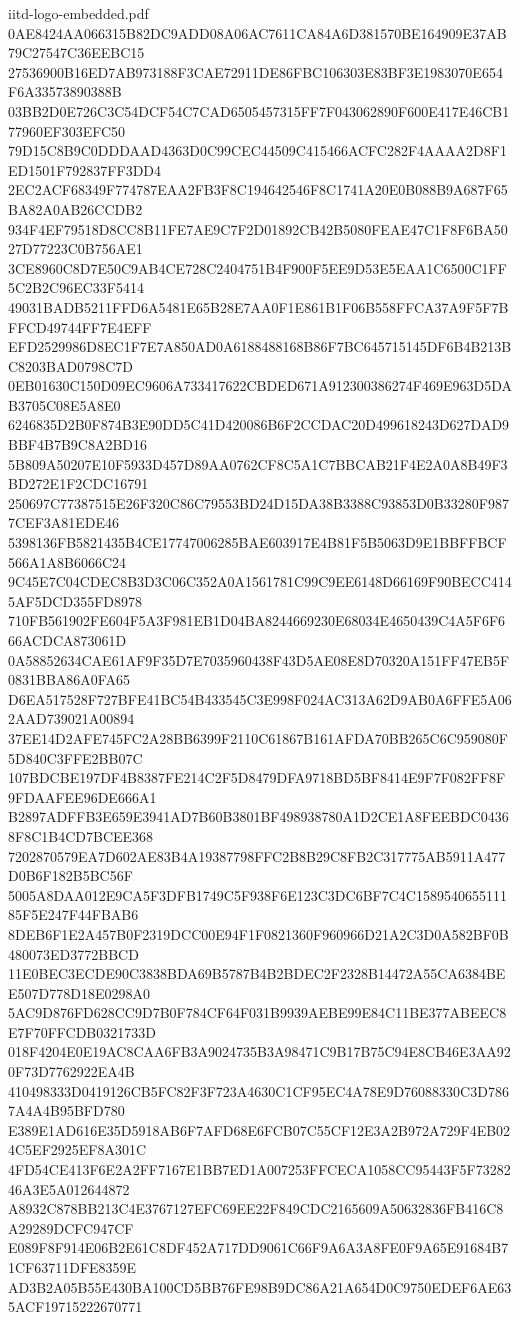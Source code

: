 \begin{filecontents*}[overwrite]{iitd-logo-embedded.pdf}
0AE8424AA066315B82DC9ADD08A06AC7611CA84A6D381570BE164909E37AB79C27547C36EEBC15
27536900B16ED7AB973188F3CAE72911DE86FBC106303E83BF3E1983070E654F6A33573890388B
03BB2D0E726C3C54DCF54C7CAD6505457315FF7F043062890F600E417E46CB177960EF303EFC50
79D15C8B9C0DDDAAD4363D0C99CEC44509C415466ACFC282F4AAAA2D8F1ED1501F792837FF3DD4
2EC2ACF68349F774787EAA2FB3F8C194642546F8C1741A20E0B088B9A687F65BA82A0AB26CCDB2
934F4EF79518D8CC8B11FE7AE9C7F2D01892CB42B5080FEAE47C1F8F6BA5027D77223C0B756AE1
3CE8960C8D7E50C9AB4CE728C2404751B4F900F5EE9D53E5EAA1C6500C1FF5C2B2C96EC33F5414
49031BADB5211FFD6A5481E65B28E7AA0F1E861B1F06B558FFCA37A9F5F7BFFCD49744FF7E4EFF
EFD2529986D8EC1F7E7A850AD0A6188488168B86F7BC645715145DF6B4B213BC8203BAD0798C7D
0EB01630C150D09EC9606A733417622CBDED671A912300386274F469E963D5DAB3705C08E5A8E0
6246835D2B0F874B3E90DD5C41D420086B6F2CCDAC20D499618243D627DAD9BBF4B7B9C8A2BD16
5B809A50207E10F5933D457D89AA0762CF8C5A1C7BBCAB21F4E2A0A8B49F3BD272E1F2CDC16791
250697C77387515E26F320C86C79553BD24D15DA38B3388C93853D0B33280F9877CEF3A81EDE46
5398136FB5821435B4CE17747006285BAE603917E4B81F5B5063D9E1BBFFBCF566A1A8B6066C24
9C45E7C04CDEC8B3D3C06C352A0A1561781C99C9EE6148D66169F90BECC4145AF5DCD355FD8978
710FB561902FE604F5A3F981EB1D04BA8244669230E68034E4650439C4A5F6F666ACDCA873061D
0A58852634CAE61AF9F35D7E7035960438F43D5AE08E8D70320A151FF47EB5F0831BBA86A0FA65
D6EA517528F727BFE41BC54B433545C3E998F024AC313A62D9AB0A6FFE5A062AAD739021A00894
37EE14D2AFE745FC2A28BB6399F2110C61867B161AFDA70BB265C6C959080F5D840C3FFE2BB07C
107BDCBE197DF4B8387FE214C2F5D8479DFA9718BD5BF8414E9F7F082FF8F9FDAAFEE96DE666A1
B2897ADFFB3E659E3941AD7B60B3801BF498938780A1D2CE1A8FEEBDC04368F8C1B4CD7BCEE368
7202870579EA7D602AE83B4A19387798FFC2B8B29C8FB2C317775AB5911A477D0B6F182B5BC56F
5005A8DAA012E9CA5F3DFB1749C5F938F6E123C3DC6BF7C4C158954065511185F5E247F44FBAB6
8DEB6F1E2A457B0F2319DCC00E94F1F0821360F960966D21A2C3D0A582BF0B480073ED3772BBCD
11E0BEC3ECDE90C3838BDA69B5787B4B2BDEC2F2328B14472A55CA6384BEE507D778D18E0298A0
5AC9D876FD628CC9D7B0F784CF64F031B9939AEBE99E84C11BE377ABEEC8E7F70FFCDB0321733D
018F4204E0E19AC8CAA6FB3A9024735B3A98471C9B17B75C94E8CB46E3AA920F73D7762922EA4B
410498333D0419126CB5FC82F3F723A4630C1CF95EC4A78E9D76088330C3D7867A4A4B95BFD780
E389E1AD616E35D5918AB6F7AFD68E6FCB07C55CF12E3A2B972A729F4EB024C5EF2925EF8A301C
4FD54CE413F6E2A2FF7167E1BB7ED1A007253FFCECA1058CC95443F5F7328246A3E5A012644872
A8932C878BB213C4E3767127EFC69EE22F849CDC2165609A50632836FB416C8A29289DCFC947CF
E089F8F914E06B2E61C8DF452A717DD9061C66F9A6A3A8FE0F9A65E91684B71CF63711DFE8359E
AD3B2A05B55E430BA100CD5BB76FE98B9DC86A21A654D0C9750EDEF6AE635ACF19715222670771

\end{filecontents*}

